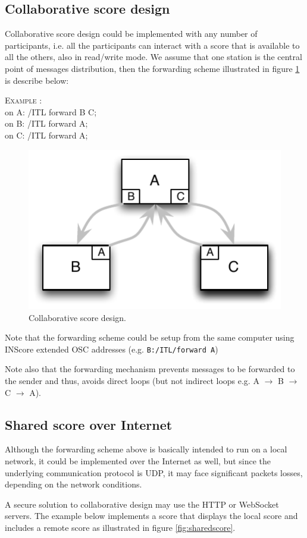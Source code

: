 \documentclass{article}
\newcounter{samplenum}
\newcommand{\code}[1]		{{\small \texttt{#1}}}
\newcommand{\sample}[1]		{ 	
								\begin{center}\colorbox{mygrey}{
								\begin{minipage}[t]{0.99\columnwidth} 
								\textsc{Example} \arabic{samplenum}: \vspace{1mm} \\
								\ttfamily \small #1  
								\end{minipage}}\end{center}
								\stepcounter{samplenum}
							}
\begin{document}
\subsection{Collaborative score design}

Collaborative score design could be implemented with any number of participants, i.e. all the participants can interact with a score that is available to all the others, also in read/write mode. We assume that one station is the central point of messages distribution, then the forwarding scheme illustrated in figure \ref{fig:collabscore} is describe below:
\sample{
on A: /ITL forward B C;\\
on B: /ITL forward A;\\
on C: /ITL forward A;
}

\begin{figure}[h]
\centering
\includegraphics[width=0.5\columnwidth]{img/collabscore}
\caption{Collaborative score design.}
\label{fig:collabscore}
\end{figure}

Note that the forwarding scheme could be setup from the same computer using INScore extended OSC addresses (e.g. \code{B:/ITL/forward A})

Note also that the forwarding mechanism prevents messages to be forwarded to the sender and thus, avoids direct loops (but not indirect loops e.g. A $\to$ B $\to$ C $\to$ A).


\subsection{Shared score over Internet}

Although the forwarding scheme above is basically intended to run on a local network, it could be implemented over the Internet as well, but since the underlying communication protocol is UDP, it may face significant packets losses, depending on the network conditions.

A secure solution to collaborative design may use the HTTP or WebSocket servers. The example below implements a score that displays the local score and includes a remote score as illustrated in figure \ref{fig:sharedscore}.
\end{document}
